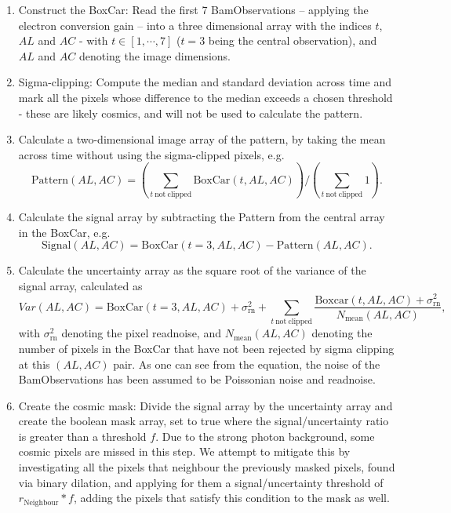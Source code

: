 \documentclass[a4paper, 11pt]{article}
\begin{document}
\begin{enumerate}
  \item Construct the BoxCar: Read the first 7 BamObservations -- applying the electron conversion gain -- into a three dimensional array with the indices $t$, $AL$ and $AC$ - with $t \in [1,\cdots,7]$ ($t = 3$ being the central observation), and $AL$ and $AC$ denoting the image dimensions.
  \item Sigma-clipping: Compute the median and standard deviation across time and mark all the pixels whose difference to the median exceeds a chosen threshold - these are likely cosmics, and will not be used to calculate the pattern.
  \item Calculate a two-dimensional image array of the pattern, by taking the mean across time without using the sigma-clipped pixels, e.g.
\begin{equation*}
  \mathrm{Pattern}\left( AL,AC \right) = \left( \sum\limits_{t~\mathrm{not~clipped}} \mathrm{BoxCar}\left( t, AL, AC \right) \right) \bigg/ \left( \sum\limits_{t~\mathrm{not~clipped}} 1\right).
\end{equation*}
  \item Calculate the signal array by subtracting the Pattern from the central array in the BoxCar, e.g.
\begin{equation*}
  \mathrm{Signal}\left( AL,AC \right) = \mathrm{BoxCar}\left(t=3,AL,AC \right) - \mathrm{Pattern}\left( AL,AC \right).
\end{equation*}
  \item Calculate the uncertainty array as the square root of the variance of the signal array, calculated as
    \begin{equation*}
      Var\left(AL,AC\right) = \mathrm{BoxCar}\left(t=3,AL,AC\right) + \sigma_\mathrm{rn}^2 + \sum\limits_{t~\mathrm{not~clipped}} \frac{\mathrm{Boxcar}\left(t,AL,AC\right) + \sigma_\mathrm{rn}^2}{N_\mathrm{mean}\left(AL,AC\right)},
    \end{equation*}
  with $\sigma_\mathrm{rn}^2$ denoting the pixel readnoise, and $N_\mathrm{mean}\left(AL,AC\right)$ denoting the number of pixels in the BoxCar that have not been rejected by sigma clipping at this $\left(AL,AC  \right)$ pair. As one can see from the equation, the noise of the BamObservations has been assumed to be Poissonian noise and readnoise.
  \item Create the cosmic mask: Divide the signal array by the uncertainty array and create the boolean mask array, set to true where the signal/uncertainty ratio is greater than a threshold $f$. Due to the strong photon background, some cosmic pixels are missed in this step. We attempt to mitigate this by investigating all the pixels that neighbour the previously masked pixels, found via binary dilation, and applying for them a signal/uncertainty threshold of $r_\mathrm{Neighbour}*f$, adding the pixels that satisfy this condition to the mask as well.

\end{enumerate}
\end{document}
